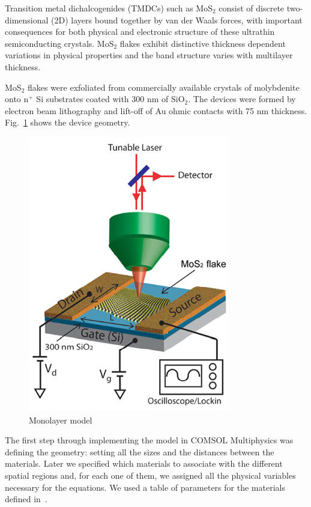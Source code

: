 \documentclass[12pt,a4paper,titlepage]{article}
\begin{document}
Transition metal dichalcogenides (TMDCs) such as MoS$_2$ consist of discrete two-dimensional (2D) layers bound together by van der Waals forces, with important consequences for both physical and electronic structure of these ultrathin semiconducting crystals. MoS$_2$ flakes exhibit distinctive thickness dependent variations in physical properties and the band structure varies with multilayer thickness.

MoS$_2$ flakes were exfoliated from commercially available crystals of molybdenite onto n$^+$ Si substrates coated with 300 nm of SiO$_2$. The devices were formed by electron beam lithography and lift-off of Au ohmic contacts with 75 nm thickness. Fig.~\ref{fig:monolayer_model} shows the device geometry.

\begin{figure}[H]
	\centering
	\includegraphics[width=.5\textwidth]{Immagini/monolayer_model.png} 
	\caption{Monolayer model~\cite{Wu:Ultrathin_MoS2}}
	\label{fig:monolayer_model}
\end{figure} 

The first step through implementing the model in COMSOL Multiphysics was defining the geometry: setting all the sizes and the distances between the materials. Later we specified which materials to associate with the different spatial regions and, for each one of them, we assigned all the physical variables necessary for the equations. We used a table of parameters for the materials defined in~\cite{Howell:MonolayerMultiLayer_MoS2}.
\end{document}
